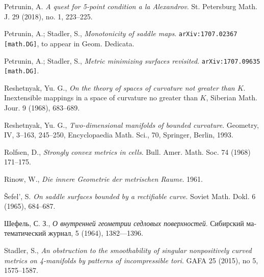 \begin{thebibliography}{52}
Petrunin, A. 
\textit{A quest for 5-point condition a la Alexandrov}.
St. Petersburg Math. J. 29 (2018), no. 1, 223--225.

Petrunin, A.; 
Stadler, S., 
\textit{Monotonicity of saddle maps}.
\texttt{arXiv:1707.02367 [math.DG]}, to appear in Geom. Dedicata.

Petrunin, A.; 
Stadler, S., 
\textit{Metric minimizing surfaces revisited}.
\texttt{arXiv:1707.09635 [math.DG]}.

Reshetnyak, Yu. G.,
\textit{On the theory of spaces of curvature not greater than $K$}.
Inextensible mappings in a space of curvature
no greater than $K$, Siberian Math. Jour. 9 (1968), 683--689.

Reshetnyak, Yu. G., 
\textit{Two-dimensional manifolds of bounded curvature}.
Geometry, IV, 3--163, 245--250, Encyclopaedia Math. Sci., 70, Springer, Berlin, 1993.

Rolfsen, D.,
\textit{Strongly convex metrics in cells}.
Bull. Amer. Math. Soc. 74 (1968) 171–175.

Rinow, W., 
\textit{Die innere Geometrie der metrischen Raume}.
1961.

\v{S}efel', S.
\textit{On saddle surfaces bounded by a rectifiable curve}.
Soviet Math. Dokl. 6 (1965), 684--687.


\begin{otherlanguage}{russian}
Шефель, С. З., 
\textit{О внутренней геометрии седловых поверхностей}.
Сибирский математический журнал, 5 (1964), 1382---1396.
\end{otherlanguage}

Stadler, S.,
\textit{An obstruction to the smoothability of singular nonpositively curved metrics on 4-manifolds by patterns of incompressible tori}.
GAFA
25 (2015), 
no 5, 
1575--1587.


\end{thebibliography}
